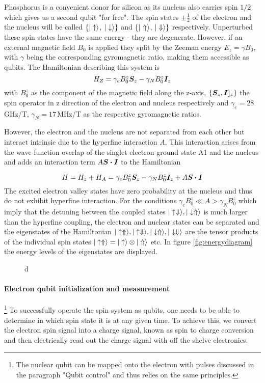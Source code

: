 Phosphorus is a convenient donor for silicon as its nucleus also carries spin $1/2$ which gives us a second qubit "for free". 
The spin states $\pm \frac{1}{2}$ of the electron and the nucleus will be called $\{|\uparrow\rangle$, $|\downarrow\rangle\}$ and $\{|\Uparrow\rangle$, $|\Downarrow\rangle\}$ respectively. Unperturbed these spin states have the same energy - they are degenerate. However, if an external magnetic field $B_0$ is applied they split by the Zeeman energy $E_z=\gamma B_0$, with $\gamma$ being the corresponding gyromagnetic ratio, making them accessible as qubits. The Hamiltonian describing this system is 
\begin{equation}
H_Z=\gamma_e B^z_0 \boldsymbol{S}_z-\gamma_N B_0^z \boldsymbol{I}_z
\end{equation}
with $B_0^z$ as the component of the magnetic field along the z-axis, $\{\boldsymbol{S}_z,\boldsymbol{I]}_z\}$ the spin operator in z direction of the electron and nucleus respectively and $\gamma_e=28\,$GHz/T, $\gamma_N=17\,$MHz/T as the respective gyromagnetic ratios.

However, the electron and the nucleus are not separated from each other but interact intrinsic due to the hyperfine interaction $A$. This interaction arises from the wave function overlap of the singlet electron ground state A1 and the nucleus and adds an interaction term $A\boldsymbol{S\cdot I}$ to the Hamiltonian

\begin{equation}
H=H_z+H_A=\gamma_e B^z_0 \boldsymbol{S}_z-\gamma_N B_0^z \boldsymbol{I}_z + A\boldsymbol{S\cdot I}
\end{equation}
The excited electron valley states have zero probability at the nucleus and thus do not exhibit hyperfine interaction. 
For the conditions $\gamma_eB_0^z \ll A>\gamma_N B_0^z $ which imply that the detuning between the coupled states $|\uparrow\Downarrow\rangle,|\downarrow\Uparrow\rangle$ is much larger than the hyperfine coupling, the electron and nuclear states can be separated and the eigenstates of the Hamiltonian $|\uparrow\Uparrow\rangle,|\uparrow\Downarrow\rangle,|\downarrow\Uparrow\rangle,|\downarrow\Downarrow\rangle$ are the tensor products of the individual spin states $|\uparrow\Uparrow\rangle=|\uparrow\rangle\otimes|\Uparrow\rangle$ etc. 
In figure \ref{fig:energydiagram} the energy levels of the eigenstates are displayed. 

\begin{figure}
d
\end{figure}


\paragraph*{Electron qubit initialization and measurement}\footnote{The nuclear qubit can be mapped onto the electron with pulses discussed in the paragraph "Qubit control" and thus relies on the same principles.}
To successfully operate the spin system as qubits, one needs to be able to determine in which spin state it is at any given time. To achieve this, we convert the electron spin signal into a charge signal, known as spin to charge conversion and then electrically read out the charge signal with off the shelve electronics.

